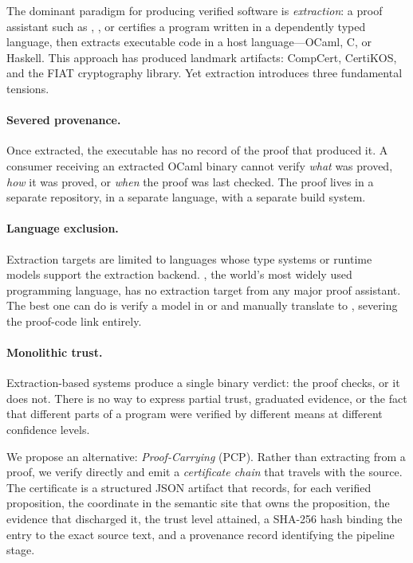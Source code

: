 \documentclass[11pt]{article}
\newcommand{\pcp}{\textsc{PCP}}           %
\begin{document}
The dominant paradigm for producing verified software is
\emph{extraction}: a proof assistant such as \Coq{}, \LEAN{}, or
\Fstar{} certifies a program written in a dependently typed language,
then extracts executable code in a host language---OCaml, C, or
Haskell.  This approach has produced landmark artifacts: CompCert,
CertiKOS, and the FIAT cryptography library.  Yet extraction introduces
three fundamental tensions.

\paragraph{Severed provenance.}
Once extracted, the executable has no record of the proof that produced
it.  A consumer receiving an extracted OCaml binary cannot verify
\emph{what} was proved, \emph{how} it was proved, or \emph{when} the
proof was last checked.  The proof lives in a separate repository, in a
separate language, with a separate build system.

\paragraph{Language exclusion.}
Extraction targets are limited to languages whose type systems or
runtime models support the extraction backend.  \Python{}, the
world's most widely used programming language, has no extraction
target from any major proof assistant.  The best one can do is
verify a model in \Fstar{} or \Dafny{} and manually translate to
\Python{}, severing the proof-code link entirely.

\paragraph{Monolithic trust.}
Extraction-based systems produce a single binary verdict:
the proof checks, or it does not.  There is no way to express
partial trust, graduated evidence, or the fact that different
parts of a program were verified by different means at different
confidence levels.

\medskip

We propose an alternative: \emph{Proof-Carrying \Python{}} (\pcp{}).
Rather than extracting \Python{} from a proof, we verify \Python{}
directly and emit a \emph{certificate chain} that travels with the
source.  The certificate is a structured JSON artifact that records,
for each verified proposition, the coordinate in the semantic site
that owns the proposition, the evidence that discharged it, the trust
level attained, a SHA-256 hash binding the entry to the exact source
text, and a provenance record identifying the pipeline stage.
\end{document}

